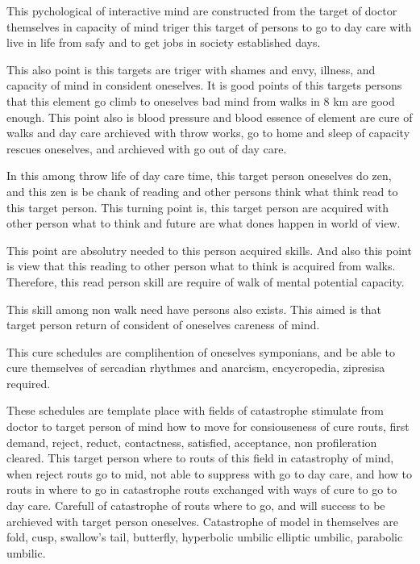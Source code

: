 \documentclass{jsarticle}
\begin{document}
         This pychological of interactive mind are constructed from
     the target of doctor themselves in capacity of mind triger
     this target of persons to go to day care with live in life from
     safy and to get jobs in society established days.



         This also point is this targets are triger with shames and envy,
     illness, and capacity of mind in consident oneselves.
     It is good points of this targets persons that this element go climb
     to oneselves bad mind from walks in 8 km are good enough.
     This point also is blood pressure and blood essence of element
     are cure of walks and day care archieved with throw works,
     go to home and sleep of capacity rescues oneselves, and
     archieved with go out of day care.



         In this among throw life of day care time, this target person
     oneselves do zen, and this zen is be chank of reading and
     other persons think what think read to this target person.
     This turning point is, this target person are acquired with other
     person what to think and future are what dones happen in world of view.



         This point are absolutry needed to this person acquired skills.
     And also this point is view that this reading to other person 
     what to think is acquired from walks. Therefore, this read person skill
     are require of walk of mental potential capacity.
     


        This skill among non walk need have persons also exists.
     This aimed is that target person return of consident of oneselves
     careness of mind.


        This cure schedules are complihention of oneselves symponians,
	and be able to cure themselves of sercadian rhythmes 
	and anarcism, encycropedia, zipresisa required.
	
        These schedules are template place with fields of catastrophe
     stimulate from doctor to target person of mind how to move
     for consiouseness of cure routs, first demand, reject, reduct,
     contactness, satisfied, acceptance, non profileration cleared.
     This target person where to routs of this field in catastrophy
     of mind, when reject routs go to mid, not able to suppress with
     go to day care, and how to routs in where to go in catastrophe routs
     exchanged with ways of cure to go to day care.
     Carefull of catastrophe of routs where to go, and will success to
     be archieved with target person oneselves.
        Catastrophe of model in themselves are fold, cusp, swallow's tail,
	butterfly, hyperbolic umbilic elliptic umbilic, parabolic umbilic.
\end{document}
